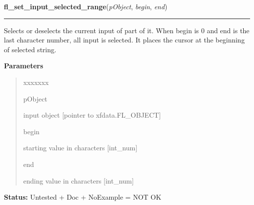 \hspace{.8\funcindent}\begin{boxedminipage}{\funcwidth}

    \raggedright \textbf{fl\_set\_input\_selected\_range}(\textit{pObject}, \textit{begin}, \textit{end})

    \vspace{-1.5ex}

    \rule{\textwidth}{0.5\fboxrule}
\setlength{\parskip}{2ex}
    Selects or deselects the current input of part of it. When begin is 0 
    and end is the last character number, all input is selected. It places 
    the cursor at the beginning of selected string.

\setlength{\parskip}{1ex}
      \textbf{Parameters}
      \vspace{-1ex}

      \begin{quote}
        \begin{Ventry}{xxxxxxx}

          \item[pObject]

          input object [pointer to xfdata.FL\_OBJECT]

          \item[begin]

          starting value in characters [int\_num]

          \item[end]

          ending value in characters [int\_num]

        \end{Ventry}

      \end{quote}

\textbf{Status:} Untested + Doc + NoExample = NOT OK



    \end{boxedminipage}

    \label{xformslib:library:fl_get_input_selected_range}

    \vspace{0.5ex}

